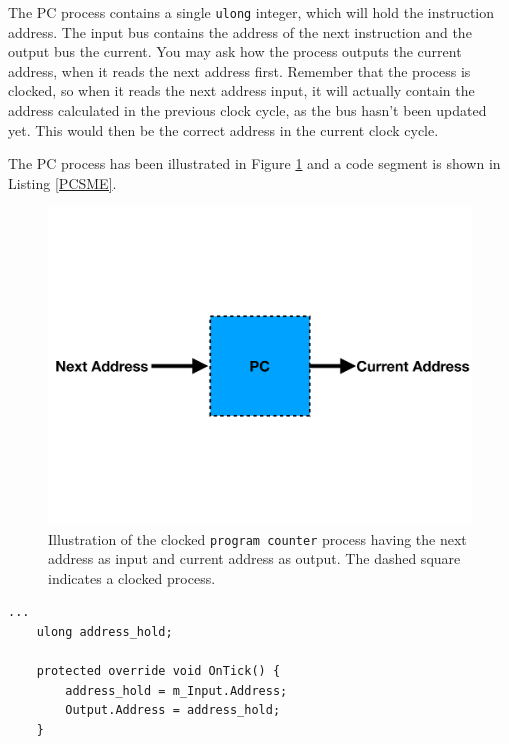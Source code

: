         The PC process contains a single \texttt{ulong} integer, which will hold the instruction address. The input bus contains the address of the next instruction and the output bus the current. You may ask how the process outputs the current address, when it reads the next address first. Remember that the process is clocked, so when it reads the next address input, it will actually contain the address calculated in the previous clock cycle, as the bus hasn't been updated yet. This would then be the correct address in the current clock cycle.
        
        The PC process has been illustrated in Figure \ref{fig:PC} and a code segment is shown in Listing \ref{PCSME}. 
        
        
        
        \begin{figure}[h!]
            \centering
            \includegraphics[scale=0.2]{pictures/PC.pdf}
            \caption{Illustration of the clocked \texttt{program counter} process having the next address as input and current address as output. The dashed square indicates a clocked process.}
            \label{fig:PC}
        \end{figure}
    
        \begin{minipage}{\linewidth}
            \begin{lstlisting}[language={[Sharp]C}, caption={A slice of the PC unit SME code, which contains variable that holds the input address. On every cycle edge it then holds and outputs the current address.},captionpos=b, label = PCSME]
...
    ulong address_hold;

    protected override void OnTick() {
        address_hold = m_Input.Address;
        Output.Address = address_hold;
    }
            \end{lstlisting}
        \end{minipage}   
    

